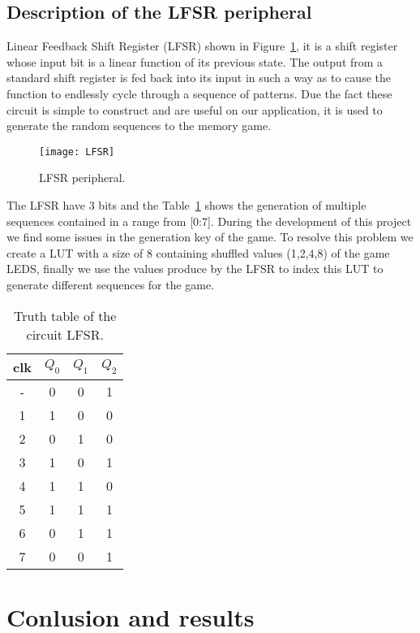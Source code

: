 \clearpage
\subsection{Description of the LFSR peripheral}
Linear Feedback Shift Register (LFSR) shown in Figure~\ref{fig:LFSR}, it is a shift register 
whose input bit is a linear function of its previous state. The output from a standard shift register is fed back into its input in such a 
way as to cause the function to endlessly cycle through a sequence of patterns. Due the fact these circuit is simple to construct
and are useful on our application, it is used to generate the random sequences to the memory game.

\vspace{10pt}
\begin{figure}[!htbp]
    \centerline{\texttt{[image: LFSR]}}
    \vspace{0cm}\caption{LFSR peripheral.}
    \label{fig:LFSR}
\end{figure}

\noindent The LFSR have 3 bits and the Table~\ref{tab:LFSR} shows the generation of multiple sequences contained in 
a range from [0:7]. During the development of this project we find some issues in the generation key of the game.
To resolve this problem we create a LUT with a size of 8 containing shuffled values (1,2,4,8) of the game LEDS,
finally we use the values produce by the LFSR to index this LUT to generate different sequences for the game.

\begin{table}[!htbp]
\centering
    \begin{tabular}{c|ccc}
        clk & $Q_0$ & $Q_1$ & $Q_2$ \\
        \hline
        - & 0 & 0 & 1 \\
        1 & 1 & 0 & 0 \\
        2 & 0 & 1 & 0 \\
        3 & 1 & 0 & 1 \\
        4 & 1 & 1 & 0 \\
        5 & 1 & 1 & 1 \\
        6 & 0 & 1 & 1 \\
        7 & 0 & 0 & 1 \\   
    \end{tabular}
    \caption{Truth table of the circuit LFSR.}
    \label{tab:LFSR}
\end{table} 

\clearpage
\section{Conlusion and results}
\label{sec:results}

